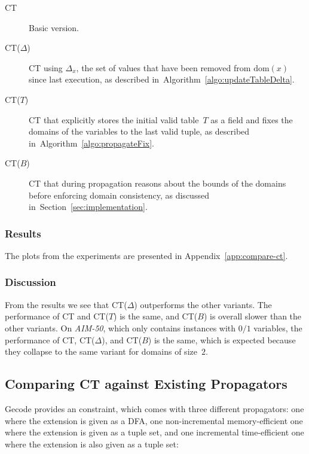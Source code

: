 \documentclass[a4paper,11pt]{article}
\newcommand{\Todo}[1]{{\color{blue}#1}}
\newcommand{\Secref}[1]{Section~\ref{#1}}
\newcommand{\Algoref}[1]{Algorithm~\ref{#1}}
\newcommand{\Dom}[1]{\text{dom}({#1})}
\numberwithin{equation}{section}
\begin{document}
\begin{description}
  \item[CT] Basic version.
  \item[CT($\Delta$)] CT using $\Delta_x$, the set
    of values that have been removed from $\Dom{x}$
    since last execution, as described in~\Algoref{algo:updateTableDelta}.
  \item[CT($T$)] CT that explicitly stores the initial valid table~$T$ as
    a field and
    fixes the domains of the variables to the last valid tuple, as described
    in~\Algoref{algo:propagateFix}.
  \item[CT($B$)] CT that during propagation reasons about the bounds of the domains before
    enforcing domain consistency, as discussed in~\Secref{sec:implementation}.
\end{description}

\subsubsection{Results}

The plots from the experiments are presented in Appendix~\ref{app:compare-ct}.

\subsubsection{Discussion}
From the results we see that CT($\Delta$) outperforms the other variants.
The performance of CT and CT($T$) is the same, and CT($B$) is overall
slower than the other variants. On \emph{AIM-50}, which only contains instances
with $0/1$ variables, the performance of CT, CT($\Delta$), and CT($B$) is
the same, which is expected because they collapse to the same variant
for domains of size~$2$.

\subsection{Comparing CT against Existing Propagators}

Gecode provides an  constraint, which
comes with three different propagators: one where the extension
is given as a DFA, one non-incremental memory-efficient one where
the extension is given as a tuple set, and one incremental
time-efficient one where the extension is also given as a tuple set:
\end{document}
